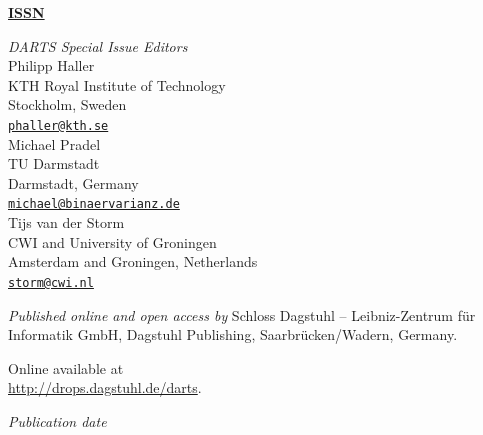\documentclass[a4paper,UKenglish]{dartsmaster}
\begin{document}
\frontmatter


\maketitle


\begin{publicationinfo}%
\sffamily
\twocolumn

{\Large\bf\sffamily \textbf{\href{http://www.dagstuhl.de/lites}{ISSN \printISSN{}}}}

\bigskip

\newcommand{\orcid}[1]{\url{http://orcid.org/#1}}
\newcommand{\email}[1]{\href{mailto:#1}{\texttt{#1}}}

\emph{DARTS Special Issue Editors} \\[0.2cm]
Philipp Haller\\
KTH Royal Institute of Technology\\
Stockholm, Sweden\\
\email{phaller@kth.se}\\

Michael Pradel\\
TU Darmstadt\\
Darmstadt, Germany\\
\email{michael@binaervarianz.de}\\

Tijs van der Storm\\
CWI and University of Groningen\\
Amsterdam and Groningen, Netherlands\\
\email{storm@cwi.nl}\\

\bigskip

\emph{Published online and open access by}\newline
Schloss Dagstuhl -- Leibniz-Zentrum f\"ur Informatik GmbH, Dagstuhl Publishing, Saarbr\"ucken/Wadern, Germany. 

Online available at \\ \url{http://drops.dagstuhl.de/darts}.

\bigskip
\emph{Publication date}\newline
\printDatePublished{}



\bigskip


\end{publicationinfo}
\end{document}
